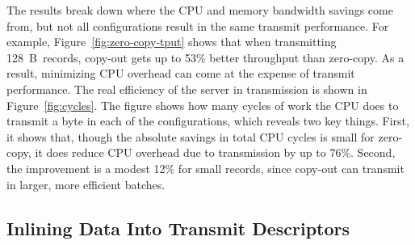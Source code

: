 
The results break down where the CPU and memory bandwidth savings come from,
but not all configurations result in the same transmit performance. For
example, Figure~\ref{fig:zero-copy-tput} shows that when transmitting
128~B~records, copy-out gets up to 53\% better throughput than zero-copy. As a result,
minimizing CPU overhead can come at the expense of transmit
performance.  The real efficiency of the server in transmission is shown in
Figure~\ref{fig:cycles}. The figure shows how many cycles of work the CPU does
to transmit a byte in each of the configurations, which reveals two key things.
First, it shows that, though the absolute savings in total CPU cycles is small
for zero-copy, it does reduce CPU overhead due to transmission by up to 76\%.
Second, the improvement is a modest 12\% for small records, since
copy-out can transmit in larger, more efficient batches.

%

%



\subsection{Inlining Data Into Transmit Descriptors}

